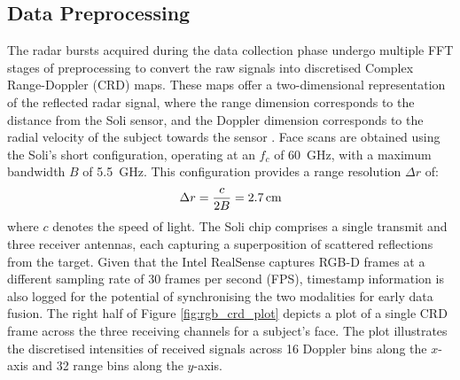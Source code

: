 \documentclass{mpaper}
\begin{document}
\subsection{Data Preprocessing}
The radar bursts acquired during the data collection phase undergo multiple FFT stages of preprocessing to convert the raw signals into discretised Complex Range-Doppler (CRD) maps. These maps offer a two-dimensional representation of the reflected radar signal, where the range dimension corresponds to the distance from the Soli sensor, and the Doppler dimension corresponds to the radial velocity of the subject towards the sensor \cite{lien2016soli,hayashi2021radarnet}. Face scans are obtained using the Soli's short configuration, operating at an $f_c$ of \qty{60}{\GHz}, with a maximum bandwidth $B$ of \qty{5.5}{\GHz}. This configuration provides a range resolution $\Delta r$ of:
$$\Delta r = \frac{c}{2B} = \text{\qty{2.7}{\cm}}$$
where $c$ denotes the speed of light. The Soli chip comprises a single transmit and three receiver antennas, each capturing a superposition of scattered reflections from the target. Given that the Intel RealSense captures RGB-D frames at a different sampling rate of 30 frames per second (FPS), timestamp information is also logged for the potential of synchronising the two modalities for early data fusion. The right half of Figure \ref{fig:rgb_crd_plot} depicts a plot of a single CRD frame across the three receiving channels for a subject's face. The plot illustrates the discretised intensities of received signals across 16 Doppler bins along the $x$-axis and 32 range bins along the $y$-axis.
\end{document}
